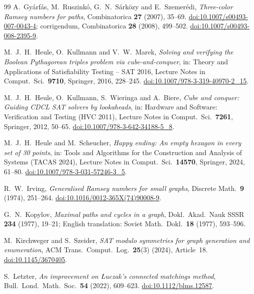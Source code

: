 \begin{thebibliography}{99}
A.~Gyárfás, M.~Ruszinkó, G.~N.~Sárközy and E.~Szemerédi,
\emph{Three-color Ramsey numbers for paths}, Combinatorica \textbf{27}
(2007), 35--69.
\href{https://doi.org/10.1007/s00493-007-0043-4}{doi:10.1007/s00493-007-0043-4};
corrigendum, Combinatorica \textbf{28} (2008), 499--502.
\href{https://doi.org/10.1007/s00493-008-2395-9}{doi:10.1007/s00493-008-2395-9}.

M.~J.~H.~Heule, O.~Kullmann and V.~W.~Marek, \emph{Solving and verifying
the Boolean Pythagorean triples problem via cube-and-conquer}, in: Theory
and Applications of Satisfiability Testing -- SAT 2016, Lecture Notes in
Comput.\ Sci.\ \textbf{9710}, Springer, 2016, 228--245.
\href{https://doi.org/10.1007/978-3-319-40970-2_15}{doi:10.1007/978-3-319-40970-2\_15}.

M.~J.~H.~Heule, O.~Kullmann, S.~Wieringa and A.~Biere, \emph{Cube and
conquer: Guiding CDCL SAT solvers by lookaheads}, in: Hardware and
Software: Verification and Testing (HVC 2011), Lecture Notes in Comput.\
Sci.\ \textbf{7261}, Springer, 2012, 50--65.
\href{https://doi.org/10.1007/978-3-642-34188-5_8}{doi:10.1007/978-3-642-34188-5\_8}.

M.~J.~H.~Heule and M.~Scheucher, \emph{Happy ending: An empty hexagon in
every set of 30 points}, in: Tools and Algorithms for the Construction and
Analysis of Systems (TACAS 2024), Lecture Notes in Comput.\ Sci.\
\textbf{14570}, Springer, 2024, 61--80.
\href{https://doi.org/10.1007/978-3-031-57246-3_5}{doi:10.1007/978-3-031-57246-3\_5}.

\bibitem{Irv74}
R.~W.~Irving, \emph{Generalised Ramsey numbers for small graphs},
Discrete Math.\ \textbf{9} (1974), 251--264.
\href{https://doi.org/10.1016/0012-365X(74)90008-9}{doi:10.1016/0012-365X(74)90008-9}.

\bibitem{Kop77}
G.~N.~Kopylov, \emph{Maximal paths and cycles in a graph}, Dokl.\ Akad.\
Nauk SSSR \textbf{234} (1977), 19--21; English translation: Soviet Math.\
Dokl.\ \textbf{18} (1977), 593--596.

\bibitem{KS24}
M.~Kirchweger and S.~Szeider, \emph{SAT modulo symmetries for graph
generation and enumeration}, ACM Trans.\ Comput.\ Log.\ \textbf{25}(3)
(2024), Article~18.
\href{https://doi.org/10.1145/3670405}{doi:10.1145/3670405}.

\bibitem{Let22}
S.~Letzter, \emph{An improvement on Łuczak's connected matchings method},
Bull.\ Lond.\ Math.\ Soc.\ \textbf{54} (2022), 609--623.
\href{https://doi.org/10.1112/blms.12587}{doi:10.1112/blms.12587}.


\end{thebibliography}
